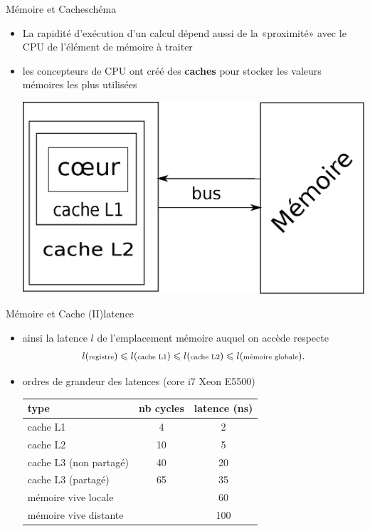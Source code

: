 \documentclass[11pt,mathserif]{beamer}
\newcommand{\gezi}{\faLongArrowRight}
\begin{document}
\begin{frame}{Mémoire et Cache}{schéma}
\begin{itemize}[<+->]
  \item La rapidité d'exécution d'un calcul dépend aussi de la «proximité» avec le CPU de l'élément de mémoire à traiter 
  \item[\gezi] les concepteurs de CPU ont créé des {\bf caches} pour stocker les valeurs mémoires les plus utilisées
  \begin{center}
    \includegraphics[width=0.7\linewidth]{fig/cpu_classique.eps}
  \end{center}
\end{itemize}
\end{frame}

\begin{frame}{Mémoire et Cache (II)}{latence}
\pause
  \begin{itemize}[<+->]
  \item ainsi la latence $l$ de l'emplacement mémoire auquel on accède  respecte
  $$l({\mbox{\scriptsize registre}}) \leqslant l(\mbox{\scriptsize cache L1}) \leqslant
    l(\mbox{\scriptsize cache L2}) \leqslant l(\mbox{\scriptsize mémoire globale}).$$
  \item ordres de grandeur des latences (core i7 Xeon E5500)
    \begin{tabular}{|l|c|c|}
    \hline
      type & nb cycles & latence (ns)  \\
    \hline
      cache L1  &  4 & 2 \\
      cache L2  &  10 & 5 \\
      cache L3 (non partagé) & 40 & 20  \\
      cache L3 (partagé) &  65 & 35  \\
      mémoire vive locale & & 60 \\
      mémoire vive distante & & 100 \\
    \hline
    \end{tabular}
  \end{itemize}
\end{frame}
\end{document}
